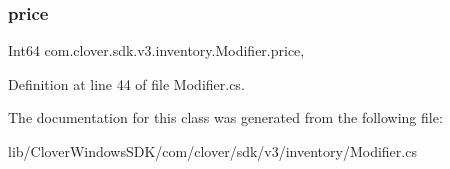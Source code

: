 \subsubsection{\texorpdfstring{price}{price}}
{\footnotesize\ttfamily Int64 com.\+clover.\+sdk.\+v3.\+inventory.\+Modifier.\+price\hspace{0.3cm}{\ttfamily [get]}, {\ttfamily [set]}}



Definition at line 44 of file Modifier.\+cs.



The documentation for this class was generated from the following file\+:\begin{DoxyCompactItemize}
\item 
lib/\+Clover\+Windows\+S\+D\+K/com/clover/sdk/v3/inventory/Modifier.\+cs\end{DoxyCompactItemize}
